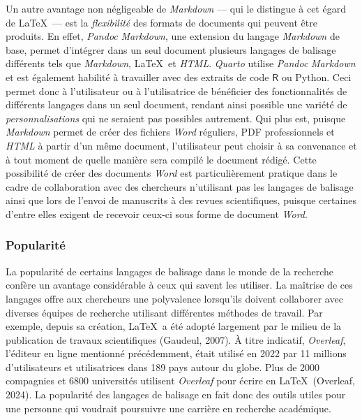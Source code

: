 \documentclass[
  letterpaper,
  DIV=11,
  numbers=noendperiod,
  oneside]{scrreprt}
\begin{document}
Un autre avantage non négligeable de \emph{Markdown} --- qui le
distingue à cet égard de \LaTeX{}~--- est la \emph{flexibilité} des
formats de documents qui peuvent être produits. En effet, \emph{Pandoc}
\emph{Markdown}, une extension du langage \emph{Markdown} de base,
permet d'intégrer dans un seul document plusieurs langages de balisage
différents tels que \emph{Markdown}, \LaTeX{}~et \emph{HTML}.
\emph{Quarto} utilise \emph{Pandoc} \emph{Markdown} et est également
habilité à travailler avec des extraits de code \(\textsf{R}\) ou
Python. Ceci permet donc à l'utilisateur ou à l'utilisatrice de
bénéficier des fonctionnalités de différents langages dans un seul
document, rendant ainsi possible une variété de \emph{personnalisations}
qui ne seraient pas possibles autrement. Qui plus est, puisque
\emph{Markdown} permet de créer des fichiers \emph{Word} réguliers, PDF
professionnels et \emph{HTML} à partir d'un même document, l'utilisateur
peut choisir à sa convenance et à tout moment de quelle manière sera
compilé le document rédigé. Cette possibilité de créer des documents
\emph{Word} est particulièrement pratique dans le cadre de collaboration
avec des chercheurs n'utilisant pas les langages de balisage ainsi que
lors de l'envoi de manuscrits à des revues scientifiques, puisque
certaines d'entre elles exigent de recevoir ceux-ci sous forme de
document \emph{Word}.

\hypertarget{popularituxe9}{%
\subsubsection{Popularité}\label{popularituxe9}}

La popularité de certains langages de balisage dans le monde de la
recherche confère un avantage considérable à ceux qui savent les
utiliser. La maîtrise de ces langages offre aux chercheurs une
polyvalence lorsqu'ils doivent collaborer avec diverses équipes de
recherche utilisant différentes méthodes de travail. Par exemple, depuis
sa création, \LaTeX{}~a été adopté largement par le milieu de la
publication de travaux scientifiques (Gaudeul, 2007). À titre indicatif,
\emph{Overleaf}, l'éditeur en ligne mentionné précédemment, était
utilisé en 2022 par 11 millions d'utilisateurs et utilisatrices dans 189
pays autour du globe. Plus de 2000 compagnies et 6800 universités
utilisent \emph{Overleaf} pour écrire en \LaTeX{}~(Overleaf, 2024). La
popularité des langages de balisage en fait donc des outils utiles pour
une personne qui voudrait poursuivre une carrière en recherche
académique.
\end{document}
